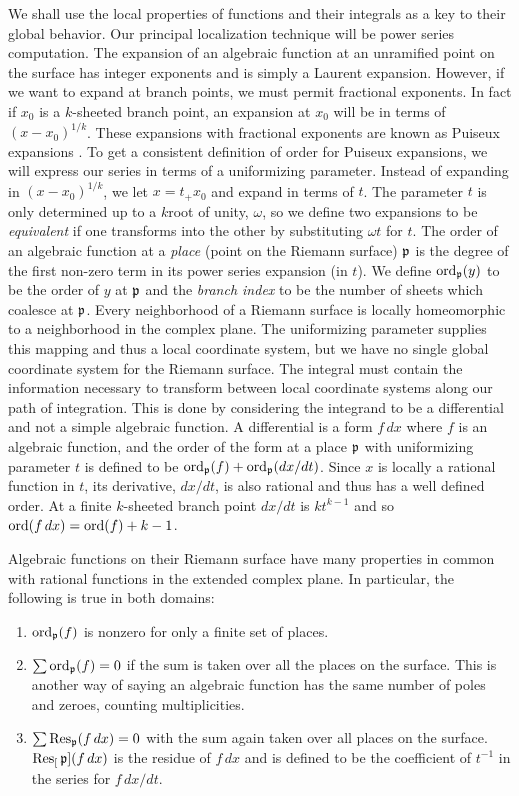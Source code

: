 We shall use the local properties of functions
and their integrals as a key to their global behavior.  Our
principal localization technique will be power series computation.
The expansion of an algebraic function at an unramified point on
the surface has integer exponents and is simply a Laurent expansion.
However, if we want to expand at branch points, we must permit
fractional exponents.  In fact if $x_0$ is a $k$-sheeted branch point,
an expansion at $x_0$ will be in terms of $(x-x_0)^{1/k}$.  These
expansions with fractional exponents are known as Puiseux expansions
\cite{Bliss:Curves}. To get a consistent definition of order for
Puiseux expansions, we will express our series in terms of a
uniformizing parameter.  Instead of expanding in $(x-x_0)^{1/k}$, we
let $x = t_+x_0$ and expand in terms of $t$.  The parameter $t$ is
only determined up to a $k$\th root of unity, $\omega$, so we define
two expansions to be {\em equivalent} if one transforms into the other
by substituting $\omega t$ for $t$.  The order of an algebraic
function at a {\em place} (point on the Riemann surface) ${\mathfrak p}$ is
the degree of the first non-zero term in its power series expansion
(in $t$).  We define $\mathop{\rm ord}\nolimits_{{\mathfrak p}}(y)$ to be the order of $y$ at
${\mathfrak p}$ and the {\em branch index} to be the number of sheets which
coalesce at ${\mathfrak p}$.  Every neighborhood of a Riemann surface is
locally homeomorphic to a neighborhood in the complex plane. The
uniformizing parameter supplies this mapping and thus a local
coordinate system, but we have no single global coordinate system for
the Riemann surface.  The integral must contain the information
necessary to transform between local coordinate systems along our path
of integration.  This is done by considering the integrand to be a
differential and not a simple algebraic function.  A differential is a
form $f\,dx$ where $f$ is an algebraic function, and the order of the
form at a place ${\mathfrak p}$ with uniformizing parameter $t$ is defined to
be $\mathop{\rm ord}\nolimits_{{\mathfrak p}}(f) + \mathop{\rm ord}\nolimits_{{\mathfrak p}}(dx/dt)$.  Since $x$ is locally a
rational function in $t$, its derivative, $dx/dt$, is also rational
and thus has a well defined order.  At a finite $k$-sheeted branch
point $dx/dt$ is $kt^{k-1}$ and so $\mathop{\rm ord}\nolimits(f\,dx)=\mathop{\rm ord}\nolimits(f)+k-1$.

Algebraic functions on their Riemann surface have
many properties in common with rational functions in the
extended complex plane.  In particular, the following is true
in both domains:

\begin{enumerate}
\item $\mathop{\rm ord}\nolimits_{{\mathfrak p}}(f)$  is nonzero for only a finite set of places. 

\item $\sum \mathop{\rm ord}\nolimits_{{\mathfrak p}}(f) = 0$ if the sum is taken over all the
places on the surface.  This is another way of saying an algebraic
function has the same number of poles and zeroes, counting multiplicities.

\item  $\sum \mathop{\rm Res}\nolimits_{{\mathfrak p}}(f\,dx) = 0$ with the sum again taken over
all places on the surface.  $\mathop{\rm Res}\nolimits_[{\mathfrak p}](f\,dx)$ is the residue of $f\,dx$
and is defined to be the coefficient of $t^{-1}$ in the series
for $f\,dx/dt$.
\end{enumerate}

